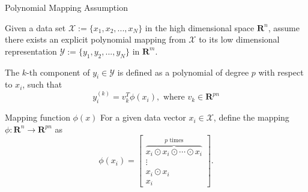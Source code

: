 \documentclass{beamer}
\begin{document}
\begin{frame}[fragile]{Polynomial Mapping Assumption} %
    \par Given a data set $\mathcal{X}:=\{x_1, x_2, ..., x_N\}$ in the high dimensional space $\mathbf{R} ^n$, assume there exists an explicit polynomial mapping from $\mathcal{X}$ to its low dimensional representation $\mathcal{Y}:=\{y_1, y_2, ..., y_N\}$ in $\mathbf{R}^m$. 
    \\ 
    \pause
    \begin{block}{}The $k$-th component of $y_i \in \mathcal{Y}$ is defined as a polynomial of degree $p$ with respect to $x_i$, such that
    \[y_{i}^{(k)} = v_k^T\phi(x_i), \text{ where } v_k \in \mathbf{R}^{pn}\]
    \end{block}
    \pause
    \begin{block}{Mapping function $\phi(x)$}
    For a given data vector $x_i \in \mathcal{X}$, define the mapping $\phi:\mathbf{R}^n\rightarrow\mathbf{R}^{pn}$ as
    \[\phi(x_i) =
    \begin{bmatrix}
    \overbrace{x_i \odot x_i \odot \cdots \odot x_i}^{p \text{ times}} \\
    \vdots \\
    x_i \odot x_i \\
    x_i
    \end{bmatrix}.\]
    \end{block}
\end{frame}
\end{document}
